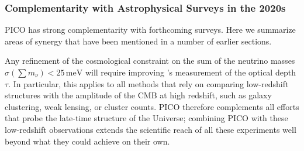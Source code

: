 \documentclass[PICOReport.tex]{subfiles}
\begin{document}

\subsubsection{Complementarity with Astrophysical Surveys in the 2020s}

PICO has strong complementarity with forthcoming surveys. Here we summarize areas of synergy that have been mentioned in a number of earlier sections. 

Any refinement of the cosmological constraint on the sum of the neutrino masses $\sigma(\sum m_\nu)<25\,\mathrm{meV}$ will require improving \planck 's measurement of the optical depth $\tau$. In particular, this applies to all methods that rely on comparing low-redshift structures with the amplitude of the CMB at high redshift, such as galaxy clustering, weak lensing, or cluster counts. PICO therefore complements all efforts that probe the late-time structure of the Universe; combining PICO with these low-redshift observations extends the scientific reach of all these experiments well beyond what they could achieve on their own.

 
\end{document}
